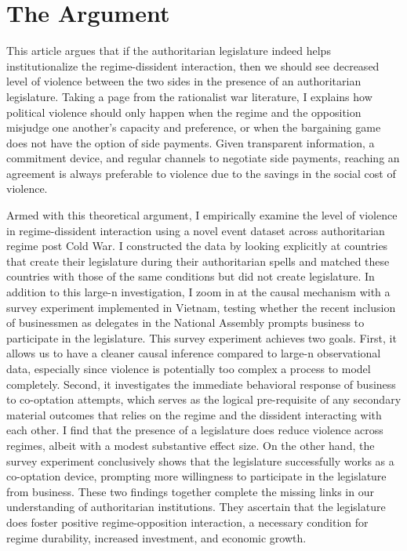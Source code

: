 \section{The Argument}
\label{sec:argument}

This article argues that if the authoritarian legislature indeed helps institutionalize the regime-dissident interaction, then we should see decreased level of violence between the two sides in the presence of an authoritarian legislature. Taking a page from the rationalist war literature, I explains how political violence should only happen when the regime and the opposition misjudge one another's capacity and preference, or when the bargaining game does not have the option of side payments. Given transparent information, a commitment device, and regular channels to negotiate side payments, reaching an agreement is always preferable to violence due to the savings in the social cost of violence.

Armed with this theoretical argument, I empirically examine the level of violence in regime-dissident interaction using a novel event dataset across authoritarian regime post Cold War. I constructed the data by looking explicitly at countries that create their legislature during their authoritarian spells and matched these countries with those of the same conditions but did not create legislature. In addition to this large-n investigation, I zoom in at the causal mechanism with a survey experiment implemented in Vietnam, testing whether the recent inclusion of businessmen as delegates in the National Assembly prompts business to participate in the legislature. This survey experiment achieves two goals. First, it allows us to have a cleaner causal inference compared to large-n observational data, especially since violence is potentially too complex a process to model completely. Second, it investigates the immediate behavioral response of business to co-optation attempts, which serves as the logical pre-requisite of any secondary material outcomes that relies on the regime and the dissident interacting with each other. I find that the presence of a legislature does reduce violence across regimes, albeit with a modest substantive effect size. On the other hand, the survey experiment conclusively shows that the legislature successfully works as a co-optation device, prompting more willingness to participate in the legislature from business. These two findings together complete the missing links in our understanding of authoritarian institutions. They ascertain that the legislature does foster positive regime-opposition interaction, a necessary condition for regime durability, increased investment, and economic growth.